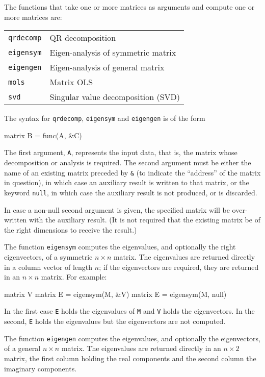 The functions that take one or more matrices as arguments and compute
one or more matrices are:

\begin{center}
\begin{tabular}{ll}
\texttt{qrdecomp} & QR decomposition \\
\texttt{eigensym} & Eigen-analysis of symmetric matrix \\
\texttt{eigengen} & Eigen-analysis of general matrix \\
\texttt{mols}     & Matrix OLS \\
\texttt{svd}      & Singular value decomposition (SVD) 
\end{tabular}
\end{center}

The syntax for \texttt{qrdecomp}, \texttt{eigensym} and
\texttt{eigengen} is of the form
%
\begin{code}
matrix B = func(A, &C)
\end{code}
%
The first argument, \texttt{A}, represents the input data, that is,
the matrix whose decomposition or analysis is required.  The second
argument must be either the name of an existing matrix preceded by
\verb+&+ (to indicate the ``address'' of the matrix in question), in
which case an auxiliary result is written to that matrix, or the
keyword \texttt{null}, in which case the auxiliary result is not
produced, or is discarded.

In case a non-null second argument is given, the specified matrix will
be over-written with the auxiliary result.  (It is not required that
the existing matrix be of the right dimensions to receive the result.)

The function \texttt{eigensym} computes the eigenvalues, and
optionally the right eigenvectors, of a symmetric $n \times n$ matrix.
The eigenvalues are returned directly in a column vector of length
$n$; if the eigenvectors are required, they are returned in an $n
\times n$ matrix.  For example:
%
\begin{code}
matrix V
matrix E = eigensym(M, &V)
matrix E = eigensym(M, null)
\end{code}
%
In the first case \texttt{E} holds the eigenvalues of \texttt{M} and
\texttt{V} holds the eigenvectors.  In the second, \texttt{E} holds
the eigenvalues but the eigenvectors are not computed.

The function \texttt{eigengen} computes the eigenvalues, and
optionally the eigenvectors, of a general $n \times n$ matrix.  The
eigenvalues are returned directly in an $n \times 2$ matrix, the first
column holding the real components and the second column the imaginary
components.  

